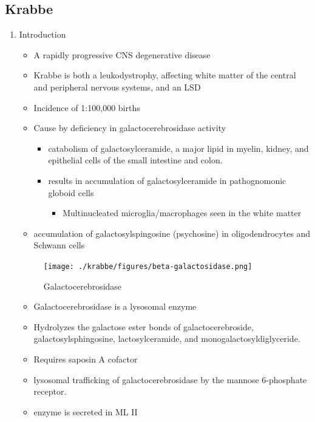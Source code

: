 \documentclass{scrartcl}
\begin{document}
\subsection{Krabbe}
\label{sec:org29af5c6}
\begin{enumerate}
\item Introduction
\label{sec:org6083a15}
\begin{itemize}
\item A rapidly progressive CNS degenerative disease
\item Krabbe is both a leukodystrophy, affecting white matter of the central
and peripheral nervous systems, and an LSD

\item Incidence of 1:100,000 births
\item Cause by deficiency in galactocerebrosidase activity
\begin{itemize}
\item catabolism of galactosylceramide, a major lipid in myelin, kidney, and epithelial cells of the small intestine and colon.
\item results in accumulation of galactosylceramide in pathognomonic globoid cells
\begin{itemize}
\item Multinucleated microglia/macrophages seen in the white matter
\end{itemize}
\end{itemize}
\item accumulation of galactosylspingosine (psychosine) in oligodendrocytes and Schwann cells
\end{itemize}

\begin{figure}[htbp]
\centering
\texttt{[image: ./krabbe/figures/beta-galactosidase.png]}
\caption{\label{fig:org24f2078}
Galactocerebrosidase}
\end{figure}

\begin{itemize}
\item Galactocerebrosidase is a lysosomal enzyme
\item Hydrolyzes the galactose ester bonds of galactocerebroside, galactosylsphingosine, lactosylceramide, and monogalactosyldiglyceride.
\item Requires saposin A cofactor
\item lysosomal trafficking of galactocerebrosidase by the mannose 6-phosphate receptor.
\item enzyme is secreted in ML II
\end{itemize}


\end{enumerate}
\end{document}
